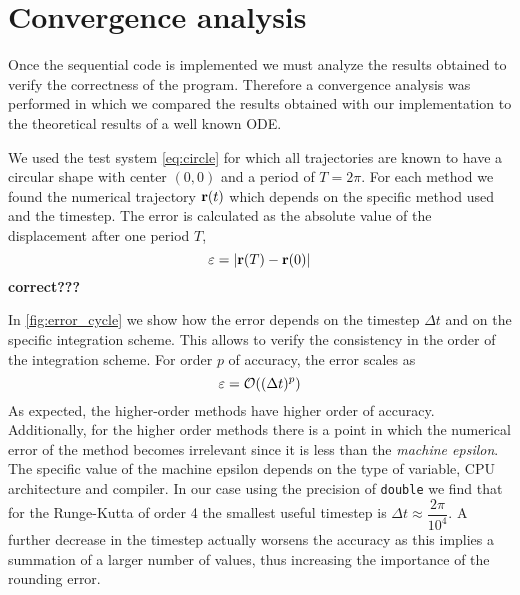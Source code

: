 
\section{Convergence analysis}%
\label{sec:convergence}

Once the sequential code is implemented we must analyze the results obtained to verify the correctness of the program. Therefore a convergence analysis was performed in which we compared the results obtained with our implementation to the theoretical results of a well known ODE.

We used the test system \cref{eq:circle} for which all trajectories are known to have a circular shape with center $(0,0)$ and a period of $T=2\pi$. For each method we found the numerical trajectory 
${\bf r}(t)$ which depends on the specific method used and the timestep.
The error is calculated as the absolute value of the displacement after one period $T$,
\begin{equation}
\varepsilon = |{\bf r}(T)-{\bf r}(0)|    
\label{Eq:epsilon:T}
\end{equation}
{\bf correct???}

In \cref{fig:error_cycle} we show how the error depends on the timestep $\Delta t$ and on the specific integration scheme. 
This allows to verify the consistency in the order of the integration scheme. For order $p$ of accuracy, the error scales as
\begin{equation}
\varepsilon = {\cal O}((\Delta t)^p)
\end{equation}
As expected, the higher-order methods have higher order of accuracy.
Additionally, for the higher order methods there is a point in which the numerical error of the method becomes irrelevant since it is less than the {\em machine epsilon}.
The specific value of the machine epsilon depends on the type of variable, CPU architecture and compiler. 
In our case using the precision of \texttt{double} we find that for the Runge-Kutta of order 4 the smallest useful timestep is $\Delta t \approx \dfrac{2\pi}{10^4}$.
A further decrease in the timestep actually worsens the accuracy as this implies a summation of a larger number of values, thus increasing the importance of the rounding error.

